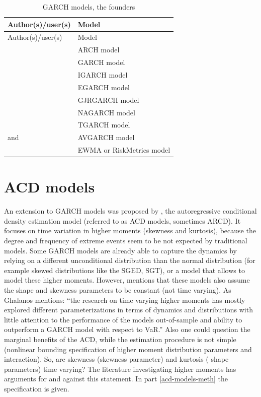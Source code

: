 \documentclass[a4paper, twoside]{templates/ociamthesis}
\begin{document}
\newpage

\begin{longtable}[]{@{}ll@{}}
\caption{GARCH models, the founders}\tabularnewline
\toprule
Author(s)/user(s) & Model\tabularnewline
\midrule
\endfirsthead
\toprule
Author(s)/user(s) & Model\tabularnewline
\midrule
\endhead
\textcite{engle1982} & ARCH model\tabularnewline
\textcite{bollerslev1986} & GARCH model\tabularnewline
\textcite{bollerslev1986} & IGARCH model\tabularnewline
\textcite{nelson1991} & EGARCH model\tabularnewline
\textcite{glosten1993} & GJRGARCH model\tabularnewline
\textcite{engle1993} & NAGARCH model\tabularnewline
\textcite{zakoian1994} & TGARCH model\tabularnewline
\textcite{taylor1986} and \textcite{schwert1989} & AVGARCH model\tabularnewline
\textcite{morganguarantytrustcompany1996} & EWMA or RiskMetrics model\tabularnewline
\bottomrule
\end{longtable}

\hypertarget{acd-models}{%
\section{ACD models}\label{acd-models}}

An extension to GARCH models was proposed by \textcite{hansen1994}, the autoregressive conditional density estimation model (referred to as ACD models, sometimes ARCD). It focuses on time variation in higher moments (skewness and kurtosis), because the degree and frequency of extreme events seem to be not expected by traditional models. Some GARCH models are already able to capture the dynamics by relying on a different unconditional distribution than the normal distribution (for example skewed distributions like the SGED, SGT), or a model that allows to model these higher moments. However, \textcite{ghalanos2016} mentions that these models also assume the shape and skewness parameters to be constant (not time varying). As Ghalanos mentions: ``the research on time varying higher moments has mostly explored different parameterizations in terms of dynamics and distributions with little attention to the performance of the models out-of-sample and ability to outperform a GARCH model with respect to VaR.'' Also one could question the marginal benefits of the ACD, while the estimation procedure is not simple (nonlinear bounding specification of higher moment distribution parameters and interaction). So, are skewness (skewness parameter) and kurtosis ( shape parameters) time varying? The literature investigating higher moments has arguments for and against this statement. In part \ref{acd-models-meth} the specification is given.
\end{document}
